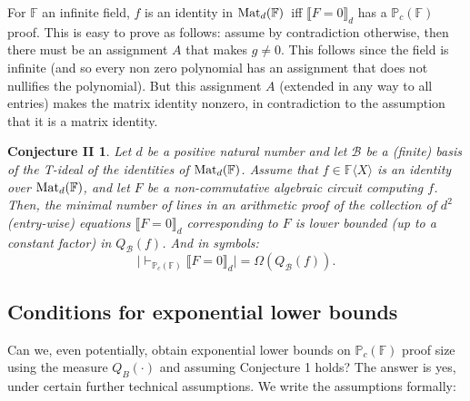 \documentclass[12pt,reqno]{article}
\newtheorem*{main-open}{Conjecture II}
\newcommand\F{\ensuremath{\mathbb F}}
\newcommand\PP{{\mathbb P}}
\newcommand\PC{\ensuremath{\PP_c}}
\newcommand{\cd}{\cdot}
\newcommand{\matd}{{\ensuremath{{\rm Mat}_d(\F)}}}
\newcommand{\freea}{\ensuremath{\F\langle X\rangle}}
\newcommand{\convert}[1]{\llbracket#1\rrbracket_d}
\begin{document}
For $\F$ an infinite field,  $f$ is an identity in \matd\ iff   $\convert{F=0}$ has a $\PC(\F)$ proof. This is easy to prove as follows: assume by contradiction
otherwise, then there must be an assignment $A$ that makes $g  \neq 0$. This follows since the field is infinite  (and so every non
zero polynomial has an assignment that does not nullifies the polynomial).
But this assignment $A$ (extended in any way to all entries) makes the
matrix identity nonzero, in contradiction to the assumption that
it is a matrix identity.




\begin{main-open}  Let $d$ be a positive natural number and let $ \mathcal B$ be a (finite) basis of the T-ideal of the identities of \matd. Assume that $f\in\freea$ is an identity over \matd, and let $F$ be a non-commutative algebraic circuit computing $f$. Then, the minimal number of lines in an arithmetic proof of the collection of  $d^2$ (entry-wise) equations $\llbracket F=0 \rrbracket_d$  corresponding to $F$ is lower bounded (up to a constant factor) in $Q_{\mathcal  B}(f)$. And in symbols:
$$\big|\vdash_{\PC(\F)}\convert{F=0}\big| = \Omega(Q_{\mathcal B}(f)).$$
\end{main-open}



\subsection{Conditions for exponential lower bounds}\label{sec:exponential-lower-bounds}
 Can we, even potentially,  obtain exponential lower bounds on $\PC(\F)$ proof size using the measure $Q_B(\cd)$ and assuming Conjecture 1 holds?
  The answer is yes, under certain further technical assumptions. We write the assumptions formally:



\end{document}
